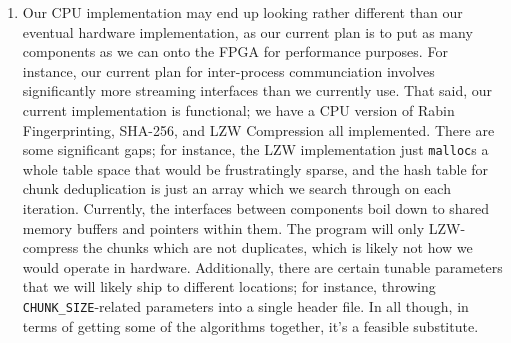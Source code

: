 \documentclass{article}
\begin{document}
\begin{enumerate}
\item%
Our CPU implementation may end up looking rather different than our eventual hardware implementation, as our current plan is to put as many components as we can onto the FPGA for performance purposes. For instance, our current plan for inter-process communciation involves significantly more streaming interfaces than we currently use.\newline\newline
That said, our current implementation is functional; we have a CPU version of Rabin Fingerprinting, SHA-256, and LZW Compression all implemented. There are some significant gaps; for instance, the LZW implementation just \texttt{malloc}s a whole table space that would be frustratingly sparse, and the hash table for chunk deduplication is just an array which we search through on each iteration.\newline\newline
Currently, the interfaces between components boil down to shared memory buffers and pointers within them. The program will only LZW-compress the chunks which are not duplicates, which is likely not how we would operate in hardware. Additionally, there are certain tunable parameters that we will likely ship to different locations; for instance, throwing \texttt{CHUNK\_SIZE}-related parameters into a single header file.\newline\newline
In all though, in terms of getting some of the algorithms together, it's a feasible substitute.

\end{enumerate}%


\begin{appendices}
%
%
%


\end{appendices}
\end{document}

